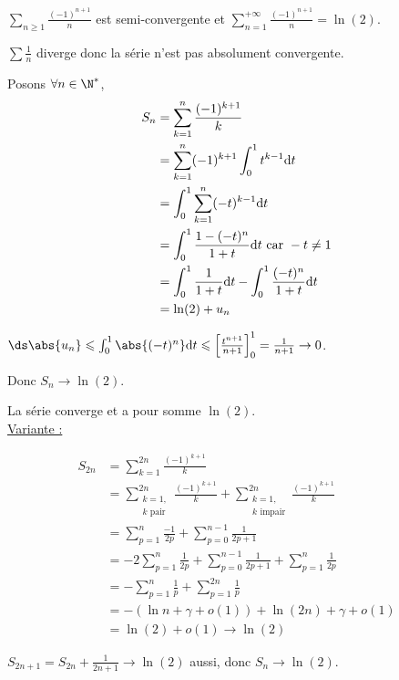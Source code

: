 \begin{exemple}
    $\displaystyle \sum_{n \geqslant 1 } \frac{(-1)^{n + 1}} n $ est semi-convergente et $\displaystyle \sum_{n = 1 }^{+ \infty} \frac{(-1)^{n + 1}} n = \ln(2)$.

    $\sum \frac 1 n$ diverge donc la série n'est pas absolument convergente. 

    Posons $\forall n \in \N^*$,
    \begin{align*}
        S_n & = \sum_{k = 1}^{n} \frac{(-1)^{k + 1}} k \\
        & = \sum_{k = 1 }^{n } (-1)^{k + 1} \int_0^1 t^{k - 1} \text d t \\
        & = \int_0^1 \sum_{k = 1 }^{n } (-t)^{k - 1} \text d t \\
        & = \int_0^1 \frac{1 - (-t)^n}{1 + t} \text d t \text{ car } -t \neq 1\\
        & = \int_0^1 \frac 1 {1 + t} \text d t - \int_0^1 \frac{(-t)^n}{1 + t} \text d t \\
        & = \ln(2) + u_n
    \end{align*}

    $\ds \abs{u_n} \leqslant \int_0^1 \abs{(-t)^n} \text d t \leqslant \left[ \frac{t^{n + 1 }}{n + 1} \right]_0^1 = \frac 1 {n + 1} \to 0$.

    Donc $S_n \to \ln(2)$.

    La série converge et a pour somme $\ln(2)$. \\

    \uline{Variante :}

    {\allowdisplaybreaks
    \begin{align*}
        S_{2n} & = \sum_{k = 1}^{2n} \frac{(-1)^{k + 1}} k \\
                & = \sum_{\substack {k = 1, \\ k \text{ pair}}}^{2n} \frac {(-1)^{k + 1}} k + \sum_{\substack{k = 1, \\ k \text{ impair}}}^{2n} \frac {(-1)^{k + 1}} k \\
                & = \sum_{p = 1}^{n} \frac{-1}{2p} + \sum_{p = 0}^{n - 1} \frac{1}{2p + 1} \\
                & = -2 \sum_{p = 1 }^{n } \frac 1 {2p} + \sum_{p = 0}^{n - 1} \frac 1 {2 p + 1} + \sum_{p = 1}^{n} \frac 1 {2p} \\
                & = - \sum_{p = 1 }^{n } \frac 1 p + \sum_{p = 1}^{2n} \frac 1 p \\
                & = - (\ln n + \gamma + o (1)) + \ln (2n) + \gamma + o(1) \\
                & = \ln(2) + o(1) \longrightarrow \ln(2)
    \end{align*}
    }

    $S_{2n + 1} = S_{2n} + \frac{1}{2n + 1} \longrightarrow \ln(2)$ aussi, donc $S_n \longrightarrow \ln(2)$.
\end{exemple}

